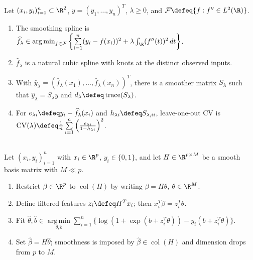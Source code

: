 \begin{method} \label{meth:sl-smoothing-spline-penalty} \\
Let $(x_i,y_i)_{i=1}^n\subset\R^2$, $y=(y_1,\ldots,y_n)^T$, $\lambda\ge0$, and $\mathcal{F}\defeq\{f:f''\in L^2(\R)\}$.
\begin{enumerate}[label=(\roman*)]
\setlength{\itemsep}{0pt}
\item The smoothing spline is $\widehat{f}_\lambda\in\operatorname*{arg\,min}_{f\in\mathcal{F}}\left\{\sum\limits_{i=1}^n(y_i-f(x_i))^2+\lambda\int_{\R}(f''(t))^2\,dt\right\}$.
\item $\widehat{f}_\lambda$ is a natural cubic spline with knots at the distinct observed inputs.
\item With $\widehat{y}_\lambda=(\widehat{f}_\lambda(x_1),\ldots,\widehat{f}_\lambda(x_n))^T$, there is a smoother matrix $S_\lambda$ such that $\widehat{y}_\lambda=S_\lambda y$ and $d_\lambda\defeq\operatorname{trace}(S_\lambda)$.
\item For $e_{\lambda i}\defeq y_i-\widehat{f}_\lambda(x_i)$ and $h_{\lambda i}\defeq S_{\lambda,ii}$, leave-one-out CV is $\operatorname{CV}(\lambda)\defeq\frac{1}{n}\sum\limits_{i=1}^n\left(\frac{e_{\lambda i}}{1-h_{\lambda i}}\right)^2$.
\end{enumerate}
\end{method}

\begin{method} \label{meth:sl-spline-filtered-logistic-features} \\
Let $(x_i,y_i)_{i=1}^n$ with $x_i\in\R^p$, $y_i\in\{0,1\}$, and let $H\in\R^{p\times M}$ be a smooth basis matrix with $M\ll p$.
\begin{enumerate}[label=(\roman*)]
\setlength{\itemsep}{0pt}
\item Restrict $\beta\in\R^p$ to $\operatorname{col}(H)$ by writing $\beta=H\theta$, $\theta\in\R^M$.
\item Define filtered features $z_i\defeq H^Tx_i$; then $x_i^T\beta=z_i^T\theta$.
\item Fit $\widehat{\theta},\widehat{b}\in\operatorname*{arg\,min}\limits_{\theta,b}\sum\limits_{i=1}^n\{\log(1+\exp(b+z_i^T\theta))-y_i(b+z_i^T\theta)\}$.
\item Set $\widehat{\beta}=H\widehat{\theta}$; smoothness is imposed by $\widehat{\beta}\in\operatorname{col}(H)$ and dimension drops from $p$ to $M$.
\end{enumerate}
\end{method}


